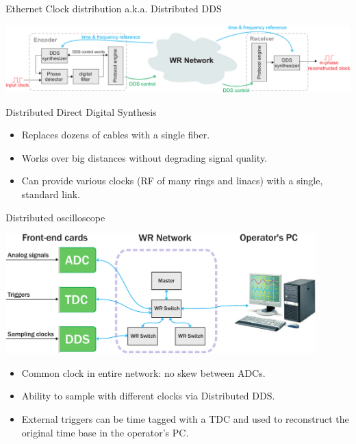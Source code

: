 \documentclass[compress, red]{beamer}
\begin{document}
\begin{frame}{Ethernet Clock distribution a.k.a. Distributed DDS}
  \begin{center}
    \includegraphics[width=\columnwidth]{applications/remote_dds.pdf}
  \end{center}
  \begin{block}{Distributed Direct Digital Synthesis}
    \begin{itemize}
    \item Replaces dozens of cables with a single fiber.
    \item Works over big distances without degrading signal quality.
    \item Can provide various clocks (RF of many rings and linacs)
      with a single, standard link.
    \end{itemize}
  \end{block}
\end{frame}

\begin{frame}{Distributed oscilloscope}
 \begin{center}
   \includegraphics[width=0.9\textwidth]{applications/distr_oscill.pdf}
   \end{center}
   \begin{block}{}
     \begin{itemize}
     \item Common clock in entire network: no skew between ADCs.
     \item Ability to sample with different clocks via Distributed DDS.
     \item External triggers can be time tagged with a TDC and used to reconstruct the original time base in the operator's 
PC.
     \end{itemize}
   \end{block}
\end{frame}
\end{document}
